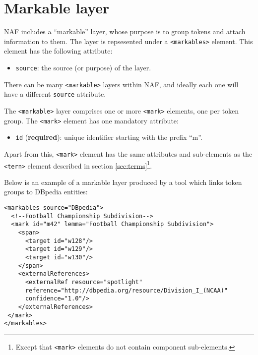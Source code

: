 \section{Markable layer}
\label{sec:markable-layer}

NAF includes a ``markable'' layer, whose purpose is to group tokens and
attach information to them. The layer is repsesented under a
\texttt{<markables>} element. This element has the following attribute:
\begin{itemize}
\item \texttt{source}: the source (or purpose) of the layer.
\end{itemize}

There can be many \texttt{<markable>} layers within NAF, and ideally each
one will have a different \texttt{source} attribute.

The \texttt{<markable>} layer comprises one or more \texttt{<mark>}
elements, one per token group. The \texttt{<mark>} element has one mandatory
attribute:
\begin{itemize}
\item \texttt{id} (\textbf{required}): unique identifier starting with the
  prefix ``m''.
\end{itemize}

Apart from this, \texttt{<mark>} element has the same attributes and
sub-elements as the \texttt{<tern>} element described in section
\ref{sec:terms}\footnote{Except that \texttt{<mark>} elements do not contain
  component sub-elements.}.

Below is an example of a markable layer produced by a tool which links token
groups to DBpedia entities:

\begin{Verbatim}[fontsize=\small]
<markables source="DBpedia">
  <!--Football Championship Subdivision-->
  <mark id="m42" lemma="Football Championship Subdivision">
    <span>
      <target id="w128"/>
      <target id="w129"/>
      <target id="w130"/>
    </span>
    <externalReferences>
      <externalRef resource="spotlight"
      reference="http://dbpedia.org/resource/Division_I_(NCAA)"
      confidence="1.0"/>
    </externalReferences>
 </mark>
</markables>
\end{Verbatim}

